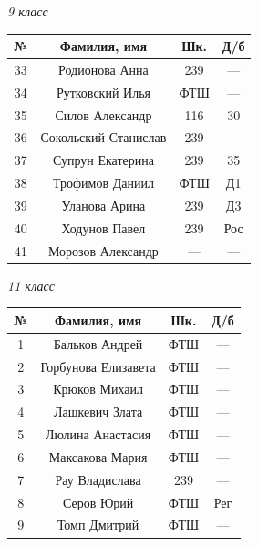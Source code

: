 \documentclass[12pt]{article}
\newlength{\h}
\newlength{\x}
\begin{document}
\begin{table}[ht]
  \begin{minipage}[t]{0.48\linewidth}\centering
    \begin{center}
      \textit{9 класс}
    \end{center}
    \begin{tabular}[h]{|c|c|c|c|}
      \hline
      \textbf{№} & \textbf{Фамилия, имя} & \textbf{Шк.} & \textbf{Д/б}\\
      \hline
      33 & Родионова Анна & 239 & ---  \\ \hline
      34 & Рутковский Илья & ФТШ & ---  \\ \hline
      35 & Силов Александр & 116 & 30  \\ \hline
      36 & Сокольский Станислав & 239 & ---  \\ \hline
      37 & Супрун Екатерина & 239 & 35  \\ \hline
      38 & Трофимов Даниил & ФТШ & Д1  \\ \hline
      39 & Уланова Арина & 239 & Д3  \\ \hline
      40 & Ходунов Павел & 239 & Рос  \\ \hline
      41 & Морозов Александр & --- & ---  \\ \hline
    \end{tabular}
    \begin{center}
      \textit{11 класс}
    \end{center}
    \begin{tabular}[h]{|c|c|c|c|}
      \hline
      \textbf{№} & \textbf{Фамилия, имя} & \textbf{Шк.} & \textbf{Д/б}\\
      \hline
      1 & Бальков Андрей & ФТШ & ---  \\ \hline
      2 & Горбунова Елизавета & ФТШ & ---  \\ \hline
      3 & Крюков Михаил & ФТШ & ---  \\ \hline
      4 & Лашкевич Злата & ФТШ & ---  \\ \hline
      5 & Люлина Анастасия & ФТШ & ---  \\ \hline
      6 & Максакова Мария & ФТШ & ---  \\ \hline
      7 & Рау Владислава & 239 & ---  \\ \hline
      8 & Серов Юрий & ФТШ & Рег  \\ \hline
      9 & Томп Дмитрий & ФТШ & ---  \\ \hline
    \end{tabular}
  \end{minipage}

\end{table}
\end{document}
